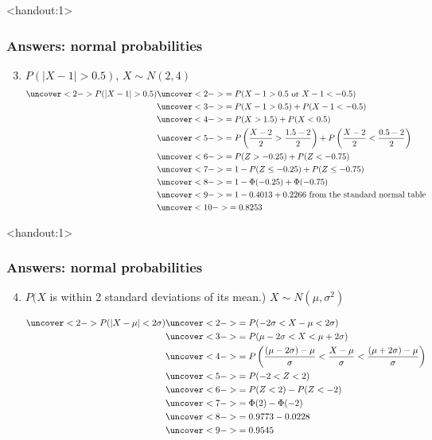 \documentclass[handout]{beamer}\usepackage[]{graphicx}\usepackage[]{color}
\newcommand{\answers}{1}
\numberwithin{equation}{section}
\begin{document}
\begin{frame}<handout:\answers>
\frametitle{Answers: normal probabilities} \scriptsize
\begin{enumerate}
\setcounter{enumi}{2}
\item $P(|X-1| > 0.5)$, $X \sim N(2,4)$
\begin{align*}
\uncover<2->{P(|X-1| > 0.5) }& \uncover<2->{= P(X - 1 > 0.5 \text{ or } X - 1 < -0.5 )} \\
&\uncover<3->{= P(X -1 > 0.5) + P(X -1 < -0.5)} \\
&\uncover<4->{=P(X > 1.5) + P(X < 0.5)} \\
&\uncover<5->{= P\left (\frac{X - 2}{2} > \frac{1.5 - 2}{2} \right) + P\left (\frac{X - 2}{2} < \frac{0.5 - 2}{2} \right )} \\
&\uncover<6->{= P(Z > -0.25) + P(Z < -0.75)} \\
&\uncover<7->{= 1 - P(Z \le -0.25) + P(Z \le -0.75)} \\
&\uncover<8->{= 1 - \Phi(-0.25) + \Phi(-0.75)} \\
&\uncover<9->{= 1 - 0.4013 + 0.2266 \text{ from the standard normal table}} \\
&\uncover<10->{= 0.8253}
\end{align*}
\end{enumerate}
\end{frame}

\begin{frame}<handout:\answers>
\frametitle{Answers: normal probabilities} \scriptsize
\begin{enumerate}
\setcounter{enumi}{3}

\item $P(X$ is within 2 standard deviations of its mean.) $X \sim N(\mu, \sigma^2)$

\begin{align*}
\uncover<2->{P(|X - \mu| < 2 \sigma)} & \uncover<2->{= P(-2\sigma < X - \mu < 2 \sigma )} \\
&\uncover<3->{= P(\mu - 2 \sigma < X < \mu + 2 \sigma)} \\
&\uncover<4->{= P\left (\frac{(\mu - 2 \sigma)- \mu}{\sigma} < \frac{X - \mu}{\sigma} < \frac{(\mu + 2 \sigma)- \mu}{\sigma} \right)} \\
&\uncover<5->{= P ( -2 < Z < 2)} \\
&\uncover<6->{= P(Z < 2) - P(Z < -2)} \\
&\uncover<7->{= \Phi(2) - \Phi(-2)} \\
&\uncover<8->{= 0.9773 - 0.0228} \\
&\uncover<9->{= 0.9545}
\end{align*}

\end{enumerate}
\end{frame}
\end{document}
